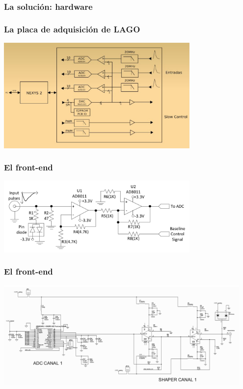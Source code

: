 \documentclass{beamer}
\begin{document}
\subsubsection{La solución: hardware}

\begin{frame}
  \frametitle{La placa de adquisición de LAGO}
  \begin{block}{}
    \centering
    \includegraphics[height=0.55\textheight,width=0.75\textwidth]{d5/diagrama_en_bloques_lago}
  \end{block}
\end{frame}

\begin{frame}
  \frametitle{El front-end}
  \begin{block}{}
    \centering
    \includegraphics[height=0.50\textheight,width=0.75\textwidth]{d5/front_end_circuit2}
  \end{block}
\end{frame}

\begin{frame}
  \frametitle{El front-end}
  \begin{block}{}
    \centering
    \includegraphics[height=0.75\textheight,width=0.95\textwidth]{d5/shaper_lago}
  \end{block}
\end{frame}
\end{document}
